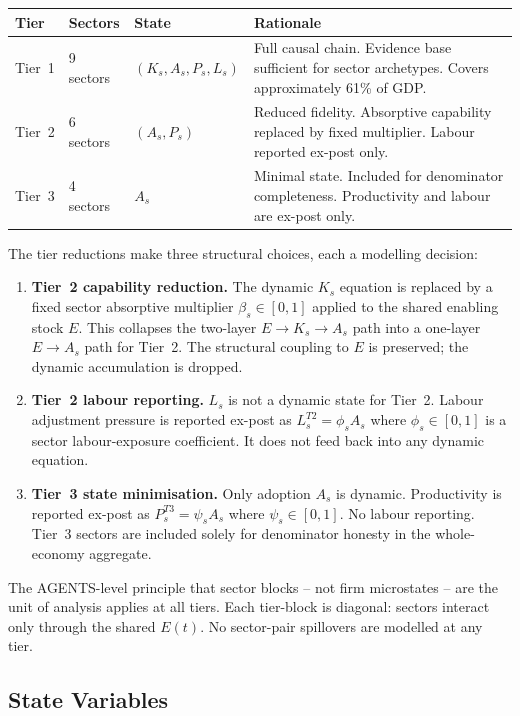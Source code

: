 \documentclass[11pt,a4paper]{article}
\begin{document}
\begin{center}
\begin{tabular}{lllp{5.5cm}}
\toprule
Tier & Sectors & State & Rationale \\
\midrule
Tier~1 & 9 sectors & $(K_s, A_s, P_s, L_s)$ & Full causal chain. Evidence base sufficient for sector archetypes. Covers approximately 61\% of GDP. \\
Tier~2 & 6 sectors & $(A_s, P_s)$ & Reduced fidelity. Absorptive capability replaced by fixed multiplier. Labour reported ex-post only. \\
Tier~3 & 4 sectors & $A_s$ & Minimal state. Included for denominator completeness. Productivity and labour are ex-post only. \\
\bottomrule
\end{tabular}
\end{center}

The tier reductions make three structural choices, each a modelling decision:
\begin{enumerate}[label=\arabic*.]
  \item \textbf{Tier~2 capability reduction.} The dynamic $K_s$ equation is replaced by a fixed sector absorptive multiplier $\beta_s \in [0,1]$ applied to the shared enabling stock $E$. This collapses the two-layer $E \to K_s \to A_s$ path into a one-layer $E \to A_s$ path for Tier~2. The structural coupling to $E$ is preserved; the dynamic accumulation is dropped.
  \item \textbf{Tier~2 labour reporting.} $L_s$ is not a dynamic state for Tier~2. Labour adjustment pressure is reported ex-post as $L_s^{T2} = \phi_s A_s$ where $\phi_s \in [0,1]$ is a sector labour-exposure coefficient. It does not feed back into any dynamic equation.
  \item \textbf{Tier~3 state minimisation.} Only adoption $A_s$ is dynamic. Productivity is reported ex-post as $P_s^{T3} = \psi_s A_s$ where $\psi_s \in [0,1]$. No labour reporting. Tier~3 sectors are included solely for denominator honesty in the whole-economy aggregate.
\end{enumerate}

The AGENTS-level principle that sector blocks -- not firm microstates -- are the unit of analysis applies at all tiers. Each tier-block is diagonal: sectors interact only through the shared $E(t)$. No sector-pair spillovers are modelled at any tier.

\subsection{State Variables}
\label{sec:statevars}
\end{document}
